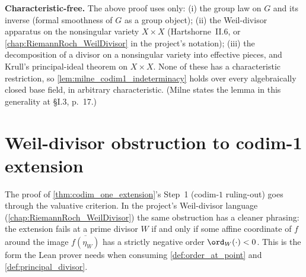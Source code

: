 \begin{remark}
  \label{rmk:milne_lem33_charfree}
  \textbf{Characteristic-free.} The above proof uses only: (i) the group law on \(G\)
  and its inverse (formal smoothness of \(G\) as a group object); (ii) the Weil-divisor
  apparatus on the nonsingular variety \(X \times X\) (Hartshorne~II.6, or
  \cref{chap:RiemannRoch_WeilDivisor} in the project's notation); (iii) the
  decomposition of a divisor on a nonsingular variety into effective pieces, and
  Krull's principal-ideal theorem on \(X \times X\). None of these has a characteristic
  restriction, so \cref{lem:milne_codim1_indeterminacy} holds over every
  algebraically closed base field, in arbitrary characteristic. (Milne states the
  lemma in this generality at \S I.3, p.~17.)
\end{remark}

\section{Weil-divisor obstruction to codim-1 extension}
\label{sec:weil_obstruction}

The proof of \cref{thm:codim_one_extension}'s Step~1 (codim-\(1\) ruling-out) goes
through the valuative criterion. In the project's Weil-divisor language
(\cref{chap:RiemannRoch_WeilDivisor}) the same obstruction has a cleaner phrasing:
the extension fails at a prime divisor \(W\) if and only if some affine coordinate of
\(f\) around the image \(\overline{f(\eta_W)}\) has a strictly negative order
\(\ord_W(\cdot) < 0\). This is the form the Lean prover needs when consuming
\cref{def:order_at_point} and \cref{def:principal_divisor}.

